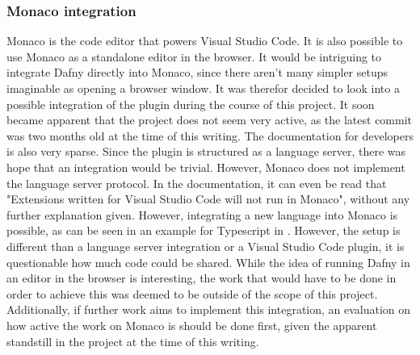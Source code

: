 \subsubsection{Monaco integration}
Monaco\cite{monaco} is the code editor that powers Visual Studio Code. It is also possible to use Monaco as a standalone editor in the browser. It would be intriguing to integrate Dafny directly into Monaco, since there aren't many simpler setups imaginable as opening a browser window. It was therefor decided to look into a possible integration of the plugin during the course of this project. \newline
It soon became apparent that the project does not seem very active, as the latest commit was two months old at the time of this writing. The documentation for developers is also very sparse. Since the plugin is structured as a language server, there was hope that an integration would be trivial. However, Monaco does not implement the language server protocol. In the documentation, it can even be read that "Extensions written for Visual Studio Code will not run in Monaco"\cite{monaco}, without any further explanation given. \newline
However, integrating a new language into Monaco is possible, as can be seen in an example for Typescript in  \cite{monacoType}. However, the setup is different than a language server integration or a Visual Studio Code plugin, it is questionable how much code could be shared. While the idea of running Dafny in an editor in the browser is interesting, the work that would have to be done in order to achieve this was deemed to be outside of the scope of this project. Additionally, if further work aims to implement this integration, an evaluation on how active the work on Monaco is should be done first, given the apparent standstill in the project at the time of this writing.